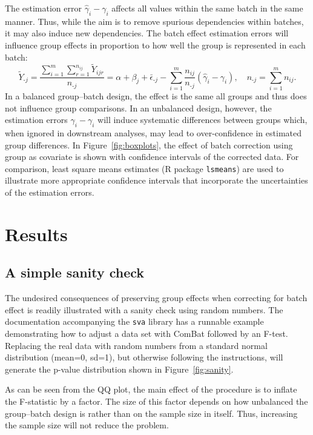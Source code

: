 \documentclass{bio}
\begin{document}
The estimation error $\hat\gamma_i-\gamma_i$ affects all values within the same batch in the same manner. Thus, while the aim is to remove spurious dependencies within batches, it may also induce new dependencies. The batch effect estimation errors will influence group effects in proportion to how well the group is represented in each batch:
\begin{equation}
\widetilde{Y}_{\textrm{-}j}
=\frac{\sum_{i=1}^m\sum_{r=1}^{n_{ij}}\widetilde{Y}_{ijr}}{n_{\textrm{-}j}}
=\alpha+\beta_j+\bar{\epsilon}_{\textrm{-}j}
  -\sum_{i=1}^m \frac{n_{ij}}{n_{\textrm{-}j}}(\hat{\gamma}_i-\gamma_i),
\quad
n_{\textrm{-}j}=\sum_{i=1}^m n_{ij}.
\end{equation}
In a balanced group--batch design, the effect is the same all groups and thus does not influence group comparisons. In an unbalanced design, however, the estimation errors $\hat\gamma_i-\gamma_i$ will induce systematic differences between groups which, when ignored in downstream analyses, may lead to over-confidence in estimated group differences. In Figure~\ref{fig:boxplots}, the effect of batch correction using group as covariate is shown with confidence intervals of the corrected data. For comparison, least square means estimates (R package \texttt{lsmeans}) are used to illustrate more appropriate confidence intervals that incorporate the uncertainties of the estimation errors.


\section{Results}

\subsection{A simple sanity check}

The undesired consequences of preserving group effects when correcting for batch effect is readily illustrated with a sanity check using random numbers. The documentation accompanying the \texttt{sva} library has a runnable example demonstrating how to adjust a data set with ComBat followed by an F-test. Replacing the real data with random numbers from a standard normal distribution (mean=0, sd=1), but otherwise following the instructions, will generate the p-value distribution shown in Figure~\ref{fig:sanity}.

As can be seen from the QQ plot, the main effect of the procedure is to inflate the F-statistic by a factor. The size of this factor depends on how unbalanced the group--batch design is rather than on the sample size in itself. Thus, increasing the sample size will not reduce the problem.
\end{document}
